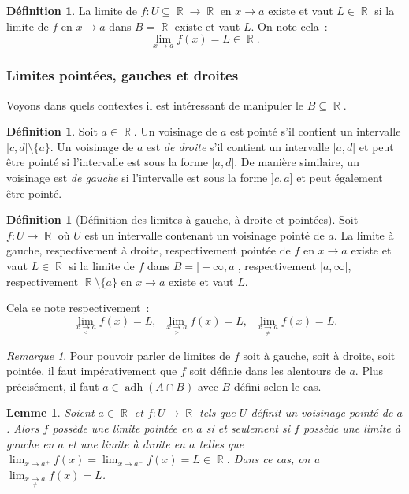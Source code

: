\documentclass{article}
\DeclareMathOperator{\R}{\mathbb R}
\DeclareMathOperator{\adh}{adh}
\newtheorem{lem}[thm]{Lemme}
\theoremstyle{definition}
\newtheorem{déf}[thm]{Définition}
\theoremstyle{remark}
\newtheorem*{rmq}{Remarque}
\begin{document}
			\begin{déf} La limite de $f : U \subseteq \R \to \R$ en $x \to a$ existe et vaut $L \in \R$ si la limite de $f$ en $x \to a$ dans $B = \R$
			existe et vaut $L$. On note cela~:
			\[\lim_{x \to a} f(x) = L \in \R.\]
			\end{déf}

		\subsubsection{Limites pointées, gauches et droites}

			Voyons dans quels contextes il est intéressant de manipuler le $B \subseteq \R$.

			\begin{déf} Soit $a \in \R$. Un voisinage de $a$ est pointé s'il contient un intervalle $]c, d[ \setminus \{a\}$. Un voisinage de $a$ est
			\textit{de droite} s'il contient un intervalle $[a, d[$ et peut être pointé si l'intervalle est sous la forme $]a, d[$. De manière similaire,
			un voisinage est \textit{de gauche} si l'intervalle est sous la forme $]c, a]$ et peut également être pointé. \end{déf}

			\begin{déf}[Définition des limites à gauche, à droite et pointées] Soit $f : U \to \R$ où $U$ est un intervalle contenant un voisinage pointé de $a$.
			La limite à gauche, respectivement à droite, respectivement pointée de $f$ en $x \to a$ existe et vaut $L \in \R$ si la limite de $f$ dans
			$B = ]-\infty, a[$, respectivement $]a, \infty[$, respectivement $\R \setminus \{a\}$ en $x \to a$ existe et vaut $L$.

			Cela se note respectivement~:
			\[\lim_{\underset{<}{x \to a}}f(x) = L, \;\;\lim_{\underset{>}{x \to a}} f(x) = L, \;\; \lim_{\underset{\neq}{x \to a}} f(x) = L.\]
			\end{déf}

			\begin{rmq} Pour pouvoir parler de limites de $f$ soit à gauche, soit à droite, soit pointée, il faut impérativement que $f$ soit définie dans les
			alentours de $a$. Plus précisément, il faut $a \in \adh(A \cap B)$ avec $B$ défini selon le cas. \end{rmq}

			\begin{lem} Soient $a \in \R$ et $f : U \to \R$ tels que $U$ définit un voisinage pointé de $a$. Alors $f$ possède une limite pointée en $a$ si et
			seulement si $f$ possède une limite à gauche en $a$ et une limite à droite en $a$ telles que $\lim_{x\to a^+}f(x) = \lim_{x \to a^-}f(x) = L \in \R$.
			Dans ce cas, on a $\lim_{\underset{\neq}{x \to a}} f(x) = L$. \end{lem}
\end{document}
